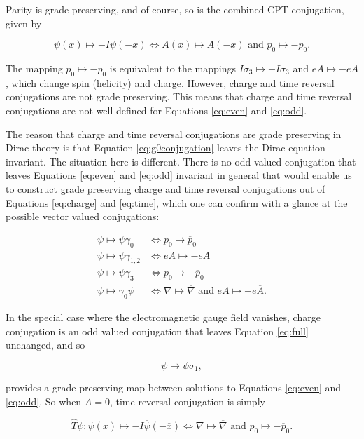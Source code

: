 \documentclass{article}
\begin{document}
  Parity is grade preserving, and of course, so is the combined CPT conjugation, given by

  \begin{equation}
    \psi(x) \mapsto -I \psi(-x) \iff A(x) \mapsto A(-x) \text{ and } p_0 \mapsto -p_0. \label{eq:cpt}
  \end{equation}

  The mapping $p_0 \mapsto -p_0$ is equivalent to the mappings $I \sigma_3 \mapsto - I \sigma_3$ and $e A \mapsto - e A$, which change spin (helicity) and charge. However, charge and time reversal conjugations are not grade preserving. This means that charge and time reversal conjugations are not well defined for Equations \ref{eq:even} and \ref{eq:odd}.

  The reason that charge and time reversal conjugations are grade preserving in Dirac theory is that Equation \ref{eq:g0conjugation} leaves the Dirac equation invariant. The situation here is different. There is no odd valued conjugation that leaves Equations \ref{eq:even} and \ref{eq:odd} invariant in general that would enable us to construct grade preserving charge and time reversal conjugations out of Equations \ref{eq:charge} and \ref{eq:time}, which one can confirm with a glance at the possible vector valued conjugations:

  \begin{align}
    \psi \mapsto \psi \gamma_0 &\iff p_0 \mapsto \overline p_0 \\
    \psi \mapsto \psi \gamma_{1,2} &\iff e A \mapsto - eA \\
    \psi \mapsto \psi \gamma_3 &\iff p_0 \mapsto - \overline p_0\\
    \psi \mapsto \gamma_0 \psi &\iff \nabla \mapsto \overline \nabla \text{ and } eA \mapsto - e \overline A.
  \end{align}

  In the special case where the electromagnetic gauge field vanishes, charge conjugation is an odd valued conjugation that leaves Equation \ref{eq:full} unchanged, and so

  \begin{equation}
    \psi \mapsto \psi \sigma_1,\label{eq:no-gauge-map}
  \end{equation}

  provides a grade preserving map  between solutions to Equations \ref{eq:even} and \ref{eq:odd}. So when $A = 0$, time reversal conjugation is simply

  \begin{equation}
    \hat T \psi : \psi(x) \mapsto -I \overline \psi(-\overline x) \iff \nabla \mapsto \overline\nabla \text{ and } p_0 \mapsto - \overline p_0.\label{eq:timeA0}
  \end{equation}
\end{document}
